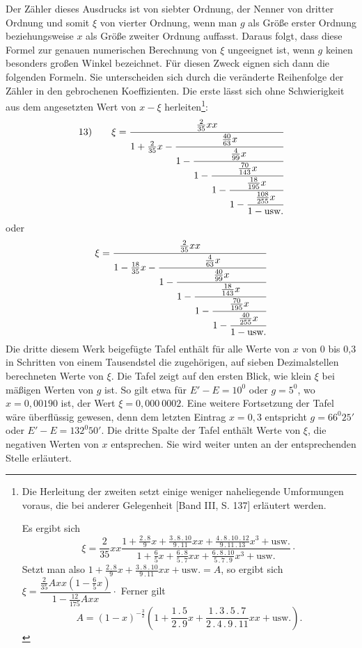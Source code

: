 Der Zähler dieses Ausdrucks ist von siebter Ordnung, der Nenner von dritter Ordnung und somit $\xi$ von vierter Ordnung, wenn man $g$ als Größe erster Ordnung beziehungsweise $x$ als Größe zweiter Ordnung auffasst. Daraus folgt, dass diese Formel zur genauen numerischen Berechnung von $\xi$ ungeeignet ist, wenn $g$ keinen besonders großen Winkel bezeichnet. Für diesen Zweck eignen sich dann die folgenden Formeln. Sie unterscheiden sich durch die veränderte Reihenfolge der Zähler in den gebrochenen Koeffizienten. Die erste lässt sich ohne Schwierigkeit aus dem angesetzten Wert von $x-\xi$ herleiten\footnote{Die Herleitung der zweiten setzt einige weniger naheliegende Umformungen voraus, die bei anderer Gelegenheit [Band III, S. 137] erläutert werden.
\par [Handschriftliche Bemerkung:] Es ergibt sich
\[
\xi=\dfrac{2}{35}xx\dfrac{1+\frac{2\mathbin{.}8}{9}x+\frac{3\mathbin{.}8\mathbin{.}10}{9\mathbin{.}11}xx+\frac{4\mathbin{.}8\mathbin{.}10\mathbin{.}12}{9\mathbin{.}11\mathbin{.}13}x^3+\text{usw.}}{1+\frac65x+\frac{6\mathbin{.}8}{5\mathbin{.}7}xx+\frac{6\mathbin{.}8\mathbin{.}10}{5\mathbin{.}7\mathbin{.}9}x^3+\text{usw.}}\mathpunct{\cdot}
\]
Setzt man also $1+\frac{2\mathbin{.}8}{9}x+\frac{3\mathbin{.}8\mathbin{.}10}{9\mathbin{.}11}xx+\text{usw.}=A$, so ergibt sich $\xi=\dfrac{\frac{2}{35}Axx(1-\frac65x)}{1-\frac{12}{175}Axx}\mathpunct{\cdot}$ Ferner gilt
\[
A=(1-x)^{-\frac32}\left(1+\frac{1\mathbin{.}5}{2\mathbin{.}9}x+\frac{1\mathbin{.}3\mathbin{.}5\mathbin{.}7}{2\mathbin{.}4\mathbin{.}9\mathbin{.}11}xx+\text{usw.}\right).
\]
}:
\[
\mathrm{13)}\qquad \xi=\cfrac{\tfrac{2}{35}xx}{1+\tfrac{2}{35}x-\cfrac{\tfrac{40}{63}x}{1-\cfrac{\tfrac{4}{99}x}{1-\cfrac{\tfrac{70}{143}x}{1-\cfrac{\tfrac{18}{195}x}{1-\cfrac{\tfrac{108}{255}x}{1-\text{usw.}}}}}}}
\]
oder
\[
\xi=\cfrac{\tfrac{2}{35}xx}{1-\tfrac{18}{35}x-\cfrac{\tfrac{4}{63}x}{1-\cfrac{\tfrac{40}{99}x}{1-\cfrac{\tfrac{18}{143}x}{1-\cfrac{\tfrac{70}{195}x}{1-\cfrac{\tfrac{40}{255}x}{1-\text{usw.}}}}}}}
\]
Die dritte diesem Werk beigefügte Tafel enthält für alle Werte von $x$ von 0 bis 0,3 in Schritten von einem Tausendstel die zugehörigen, auf sieben Dezimalstellen berechneten Werte von $\xi$. Die Tafel zeigt auf den ersten Blick, wie klein $\xi$ bei mäßigen Werten von $g$ ist. So gilt etwa für $E'-E=10^0$ oder $g=5^0$, wo $x=0{,}00190$ ist, der Wert $\xi=0{,}000\ 0002$. Eine weitere Fortsetzung der Tafel wäre überflüssig gewesen, denn dem letzten Eintrag $x=0{,}3$ entspricht $g=66^0 25'$ oder $E'-E=132^0 50'$. Die dritte Spalte der Tafel enthält Werte von $\xi$, die negativen Werten von $x$ entsprechen. Sie wird weiter unten an der entsprechenden Stelle erläutert.
